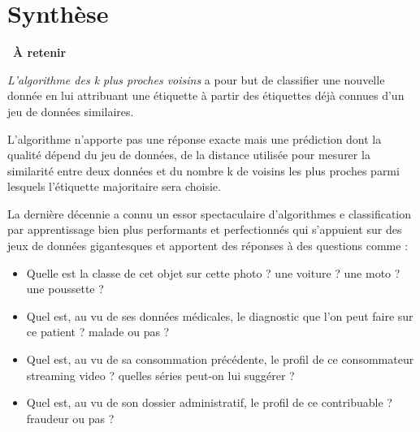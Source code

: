 \documentclass[
  11pt,
]{article}
\providecommand{\tightlist}{%
  \setlength{\itemsep}{0pt}\setlength{\parskip}{0pt}}
\newcounter{thme}
\newenvironment{memo}[1]
{\par \medskip    \noindent  
\begin{bclogo}[arrondi =0.1,  ombre = true, barre=none, logo=\bccle, marge=4]{~\textbf{À retenir}  {\itshape #1} }  \par}
{
\end{bclogo}
 \par \bigskip }
\newcounter{alg}
\begin{document}
\hypertarget{synthuxe8se}{%
\section{Synthèse}\label{synthuxe8se}}

\begin{memo}{}

\emph{L'algorithme des k plus proches voisins} a pour but de classifier
une nouvelle donnée en lui attribuant une étiquette à partir des
étiquettes déjà connues d'un jeu de données similaires.

L'algorithme n'apporte pas une réponse exacte mais une prédiction dont
la qualité dépend du jeu de données, de la distance utilisée pour
mesurer la similarité entre deux données et du nombre k de voisins les
plus proches parmi lesquels l'étiquette majoritaire sera choisie.

La dernière décennie a connu un essor spectaculaire d'algorithmes e
classification par apprentissage bien plus performants et perfectionnés
qui s'appuient sur des jeux de données gigantesques et apportent des
réponses à des questions comme :

\begin{itemize}
\tightlist
\item
  Quelle est la classe de cet objet sur cette photo ? une voiture ? une
  moto ? une poussette ?
\item
  Quel est, au vu de ses données médicales, le diagnostic que l'on peut
  faire sur ce patient ? malade ou pas ?
\item
  Quel est, au vu de sa consommation précédente, le profil de ce
  consommateur streaming video ? quelles séries peut-on lui suggérer ?
\item
  Quel est, au vu de son dossier administratif, le profil de ce
  contribuable ? fraudeur ou pas ?
\end{itemize}

\end{memo}
\end{document}
